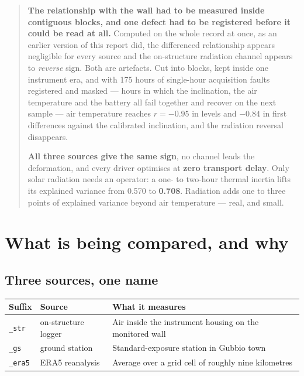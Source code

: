 \documentclass[11pt,a4paper]{article}
\begin{document}
\begin{abstract}
\textbf{The relationship with the wall had to be measured inside contiguous
blocks, and one defect had to be registered before it could be read at all.}
Computed on the whole record at once, as an earlier version of this report did,
the differenced relationship appears negligible for every source and the
on-structure radiation channel appears to \emph{reverse} sign. Both are
artefacts. Cut into blocks, kept inside one instrument era, and with 175 hours
of single-hour acquisition faults registered and masked --- hours in which the
inclination, the air temperature and the battery all fail together and recover
on the next sample --- air temperature reaches $r = -0.95$ in levels and
$-0.84$ in first differences against the calibrated inclination, and the
radiation reversal disappears.

\textbf{All three sources give the same sign}, no channel leads the deformation,
and every driver optimises at \textbf{zero transport delay}. Only solar
radiation needs an operator: a one- to two-hour thermal inertia lifts its
explained variance from 0.570 to \textbf{0.708}. Radiation adds one to three
points of explained variance beyond air temperature --- real, and small.
\end{abstract}

\tableofcontents

\section{What is being compared, and why}
\label{sec:intro}

\subsection{Three sources, one name}

\begin{center}
\small
\begin{tabularx}{\textwidth}{l l Y}
\toprule
\textbf{Suffix} & \textbf{Source} & \textbf{What it measures} \\
\midrule
\texttt{\_str} & on-structure logger & Air inside the instrument housing on the
monitored wall \\
\texttt{\_gs} & ground station & Standard-exposure station in Gubbio town \\
\texttt{\_era5} & ERA5 reanalysis & Average over a grid cell of roughly nine
kilometres \\
\bottomrule
\end{tabularx}
\end{center}
\end{document}
